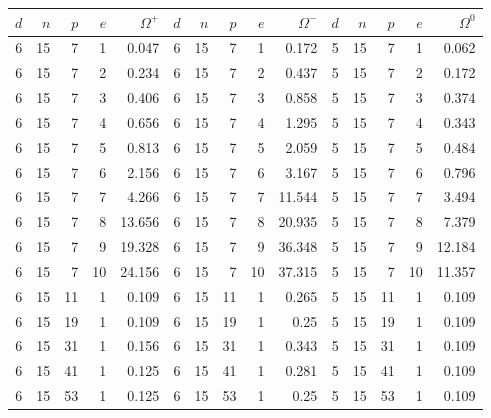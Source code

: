 \documentclass[12pt]{report}
\begin{document}
								
\begin{table}[htp]																													
\label{timings}																													
\begin{center}																													
\begin{tabular}																													
{|c|r|r|r|r||r|r|r|r|r||r|r|r|r|r|} \hline																													
$d$	&	$n$	&	$p$ 	&	$e$ 	&	$\Omega^+$	&	$d$	&	$n$	&	$p$ 	&	$e$ 	&	$\Omega^-$	&	$d$	&	$n$	&	$p$ 	&	$e$ 	&	$\Omega^0$	
\rule{0cm}{2.5ex}\\ \hline																													
6	&	15	&	7	&	1	&	0.047	&	6	&	15	&	7	&	1	&	0.172	&	5	&	15	&	7	&	1	&	0.062	\rule{0cm}{2.5ex}\\ \hline
6	&	15	&	7	&	2	&	0.234	&	6	&	15	&	7	&	2	&	0.437	&	5	&	15	&	7	&	2	&	0.172	\rule{0cm}{2.5ex}\\ \hline
6	&	15	&	7	&	3	&	0.406	&	6	&	15	&	7	&	3	&	0.858	&	5	&	15	&	7	&	3	&	0.374	\rule{0cm}{2.5ex}\\ \hline
6	&	15	&	7	&	4	&	0.656	&	6	&	15	&	7	&	4	&	1.295	&	5	&	15	&	7	&	4	&	0.343	\rule{0cm}{2.5ex}\\ \hline
6	&	15	&	7	&	5	&	0.813	&	6	&	15	&	7	&	5	&	2.059	&	5	&	15	&	7	&	5	&	0.484	\rule{0cm}{2.5ex}\\ \hline
6	&	15	&	7	&	6	&	2.156	&	6	&	15	&	7	&	6	&	3.167	&	5	&	15	&	7	&	6	&	0.796	\rule{0cm}{2.5ex}\\ \hline
6	&	15	&	7	&	7	&	4.266	&	6	&	15	&	7	&	7	&	11.544	&	5	&	15	&	7	&	7	&	3.494	\rule{0cm}{2.5ex}\\ \hline
6	&	15	&	7	&	8	&	13.656	&	6	&	15	&	7	&	8	&	20.935	&	5	&	15	&	7	&	8	&	7.379	\rule{0cm}{2.5ex}\\ \hline
6	&	15	&	7	&	9	&	19.328	&	6	&	15	&	7	&	9	&	36.348	&	5	&	15	&	7	&	9	&	12.184	\rule{0cm}{2.5ex}\\ \hline
6	&	15	&	7	&	10	&	24.156	&	6	&	15	&	7	&	10	&	37.315	&	5	&	15	&	7	&	10	&	11.357	\rule{0cm}{2.5ex}\\ \hline
6	&	15	&	11	&	1	&	0.109	&	6	&	15	&	11	&	1	&	0.265	&	5	&	15	&	11	&	1	&	0.109	\rule{0cm}{2.5ex}\\ \hline
6	&	15	&	19	&	1	&	0.109	&	6	&	15	&	19	&	1	&	0.25	&	5	&	15	&	19	&	1	&	0.109	\rule{0cm}{2.5ex}\\ \hline
6	&	15	&	31	&	1	&	0.156	&	6	&	15	&	31	&	1	&	0.343	&	5	&	15	&	31	&	1	&	0.109	\rule{0cm}{2.5ex}\\ \hline
6	&	15	&	41	&	1	&	0.125	&	6	&	15	&	41	&	1	&	0.281	&	5	&	15	&	41	&	1	&	0.109	\rule{0cm}{2.5ex}\\ \hline
6	&	15	&	53	&	1	&	0.125	&	6	&	15	&	53	&	1	&	0.25	&	5	&	15	&	53	&	1	&	0.109	\rule{0cm}{2.5ex}\\ \hline

\end{tabular}
\end{center}
\end{table}
\end{document}
